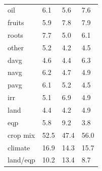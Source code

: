 \documentclass[11pt]{article}
\begin{document}
\begin{table}[h!]
{\begin{tabular}{llll}
oil & 6.1 & 5.6 & 7.6 \\
fruits & 5.9 & 7.8 & 7.9 \\
roots & 7.7 & 5.0 & 6.1 \\
other & 5.2 & 4.2 & 4.5 \\
davg & 4.6 & 4.4 & 6.3 \\
navg & 6.2 & 4.7 & 4.9 \\
pavg & 6.1 & 5.2 & 4.5 \\
irr & 5.1 & 6.9 & 4.9 \\
land & 4.4 & 4.2 & 4.9 \\
eqp & 5.8 & 9.2 & 3.8 \\
\midrule
crop mix & 52.5 & 47.4 & 56.0 \\
climate & 16.9 & 14.3 & 15.7 \\
land/eqp & 10.2 & 13.4 & 8.7 \\
\bottomrule
\end{tabular}
\caption{ }
\label{t.ny.wt_percentages}
}
\end{table}

\clearpage


\end{document}
